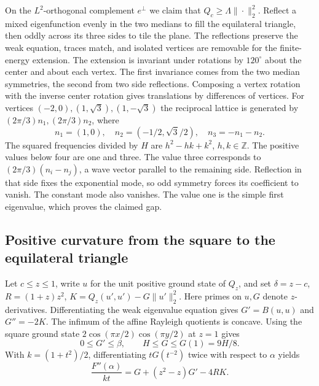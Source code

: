\documentclass[11pt,a4paper,reqno]{amsart}
\theoremstyle{remark}
\numberwithin{equation}{section}
\begin{document}
On the $L^2$-orthogonal complement $e^\perp$ we claim that
$Q_c\ge\Lambda\|\cdot\|_2^2$. Reflect a mixed eigenfunction evenly in the
two medians to fill the equilateral triangle, then oddly across its three
sides to tile the plane. The reflections preserve the weak equation, traces
match, and isolated vertices are removable for the finite-energy extension.
The extension is invariant under rotations by $120^\circ$ about the center
and about each vertex. The first invariance comes from the two median
symmetries, the second from two side reflections. Composing a vertex
rotation with the inverse center rotation gives translations by differences
of vertices. For vertices $(-2,0),(1,\sqrt3),(1,-\sqrt3)$ the reciprocal
lattice is generated by $(2\pi/3)n_1,(2\pi/3)n_2$, where
\[
 n_1=(1,0),\quad n_2=(-1/2,\sqrt3/2),\quad n_3=-n_1-n_2 .
\]
The squared frequencies divided by $H$ are $h^2-hk+k^2$, $h,k\in\mathbb Z$.
The positive values below four are one and three. The value three corresponds
to $(2\pi/3)(n_i-n_j)$, a wave vector parallel to the remaining side.
Reflection in that side fixes the exponential mode, so odd symmetry forces
its coefficient to vanish. The constant mode also vanishes. The value one
is the simple first eigenvalue, which proves the claimed gap.

\subsection{Positive curvature from the square to the equilateral triangle}
Let $c\le z\le1$, write $u$ for the unit positive ground state of $Q_z$, and
set $\delta=z-c$, $R=(1+z)z^2$, $K=Q_z(u',u')-G\|u'\|_2^2$. Here primes on
$u,G$ denote $z$-derivatives. Differentiating the weak eigenvalue equation
gives $G'=B(u,u)$ and $G''=-2K$. The infimum of the affine Rayleigh
quotients is concave. Using the square ground state
$2\cos(\pi x/2)\cos(\pi y/2)$ at $z=1$ gives
\[
    0\le G'\le\beta,\qquad H\le G\le G(1)=9H/8.
\]
With $k=(1+t^2)/2$, differentiating $tG(t^{-2})$ twice with respect to
$\alpha$ yields
\begin{equation}\label{eq:angcurv}
 \frac{F''(\alpha)}{kt}=G+(z^2-z)G'-4RK .
\end{equation}
\end{document}
